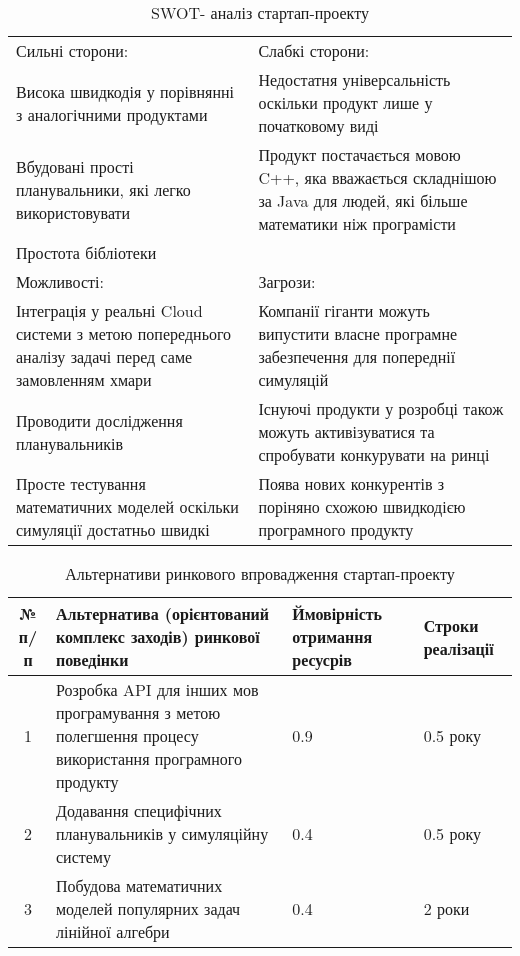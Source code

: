\begin{table}[H]
	\centering
	\caption{SWOT- аналіз стартап-проекту}
	\begin{tabular}{|p{5cm}|p{5cm}|}
		\hline
		Сильні сторони: & Слабкі сторони:
		\\
		
		\tabitem Висока швидкодія у порівнянні з аналогічними продуктами & \tabitem Недостатня універсальність оскільки продукт лише у початковому виді
		\\
		\tabitem Вбудовані прості планувальники, які легко використовувати & \tabitem Продукт постачається мовою C++, яка вважається складнішою за Java для людей, які більше  математики ніж програмісти
		\\
		\tabitem Простота бібліотеки & 
		\\ \hline
		
		Можливості: & Загрози:
		\\
		\tabitem Інтеграція у реальні Cloud системи з метою попереднього аналізу задачі перед саме замовленням хмари & \tabitem Компанії гіганти можуть випустити власне програмне забезпечення для попереднії симуляцій
		\\
		\tabitem Проводити дослідження планувальників & \tabitem Існуючі продукти у розробці також можуть активізуватися та спробувати конкурувати на ринці
		\\
		\tabitem Просте тестування математичних моделей оскільки симуляції достатньо швидкі & \tabitem Поява нових конкурентів з поріняно схожою швидкодією програмного продукту
		\\ \hline
		
	\end{tabular}
\end{table}

\begin{table}[H]
	\centering
	\caption{Альтернативи ринкового впровадження стартап-проекту}
	\begin{tabular}{|c|p{4cm}|p{4cm}|p{4cm}|} \hline
		№ п/п
		& Альтернатива (орієнтований комплекс заходів) ринкової поведінки
		& Ймовірність отримання ресусрів & Строки реалізації
		\\ \hline
		
		1
		& Розробка API для інших мов програмування з метою полегшення процесу використання програмного продукту
		& 0.9
		& 0.5 року
		\\ \hline
		
		2
		& Додавання специфічних планувальників у симуляційну систему
		& 0.4
		& 0.5 року
		\\ \hline
		
		3
		& Побудова математичних моделей популярних задач лінійної алгебри
		& 0.4
		& 2 роки
		\\ \hline
	\end{tabular}
\end{table}

